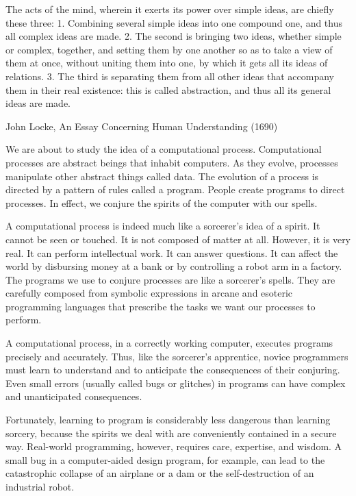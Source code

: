 

\startnarrower[4*left]
The acts of the mind,
wherein it exerts its power over simple ideas,
are chiefly these three:
1. Combining several simple ideas into one compound one, and thus all complex ideas are made.
2. The second is bringing two ideas, whether simple or complex, together,
and setting them by one another so as to take a view of them at once,
without uniting them into one, by which it gets all its ideas of relations.
3. The third is separating them from all other ideas that accompany them in their real existence:
this is called abstraction, and thus all its general ideas are made.

John Locke, An Essay Concerning Human Understanding (1690)
\stopnarrower

We are about to study the idea of a computational process.
Computational processes are abstract beings that inhabit computers.
As they evolve, processes manipulate other abstract things called data.
The evolution of a process is directed by a pattern of rules called a program.
People create programs to direct processes.
In effect, we conjure the spirits of the computer with our spells.

A computational process is indeed much like a sorcerer's idea of a spirit.
It cannot be seen or touched. It is not composed of matter at all.
However, it is very real.
It can perform intellectual work.
It can answer questions.
It can affect the world by disbursing money at a bank or by controlling a robot arm in a factory.
The programs we use to conjure processes are like a sorcerer's spells.
They are carefully composed from symbolic expressions in arcane and esoteric programming languages
that prescribe the tasks we want our processes to perform.

A computational process, in a correctly working computer, executes programs precisely and accurately.
Thus, like the sorcerer's apprentice,
novice programmers must learn to understand and to anticipate the consequences of their conjuring.
Even small errors (usually called bugs or glitches) in programs can have complex and unanticipated consequences.

Fortunately,
learning to program is considerably less dangerous than learning sorcery,
because the spirits we deal with are conveniently contained in a secure way.
Real-world programming, however, requires care, expertise, and wisdom.
A small bug in a computer-aided design program, for example,
can lead to the catastrophic collapse of an airplane or a dam or the self-destruction of an industrial robot.

